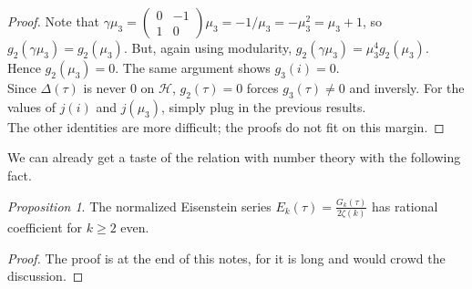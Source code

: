 \documentclass[11pt]{article}
\theoremstyle{plain}
\theoremstyle{definition}
\theoremstyle{example}
\theoremstyle{remark}
\theoremstyle{lemma}
\theoremstyle{proposition}
\newtheorem{proposition}{Proposition}[section]
\theoremstyle{Problem}
\theoremstyle{Solution}
\theoremstyle{theorem}
\theoremstyle{corollary}
\begin{document}
\begin{proof}
Note that $ \gamma\mu_3=\begin{pmatrix}
0 & -1 \\
1 & 0
\end{pmatrix} \mu_3 = -1/\mu_3 = -\mu_3^2=\mu_3+1$, so $g_2(\gamma \mu_3) = g_2(\mu_3)$. But, again using modularity, $g_2(\gamma\mu_3) = \mu_3^4g_2(\mu_3)$. Hence $g_2(\mu_3) = 0$. The same argument shows $g_3(i) = 0$.\\
Since $\Delta(\tau)$ is never $0$ on $\mathcal{H}$, $g_2(\tau) = 0$ forces $g_3(\tau)\neq 0$ and inversly. For the values of $j(i)$ and $j(\mu_3)$, simply plug in the previous results.\\
The other identities are more difficult; the proofs do not fit on this margin.
\end{proof}

We can already get a taste of the relation with number theory with the following fact.
\begin{proposition}
The normalized Eisenstein series $E_k(\tau) = \frac{G_k(\tau)}{2\zeta(k)}$ has rational coefficient for $k\geq 2$ even.
\end{proposition}
\begin{proof}
The proof is at the end of this notes, for it is long and would crowd the discussion.
\end{proof}
\end{document}
